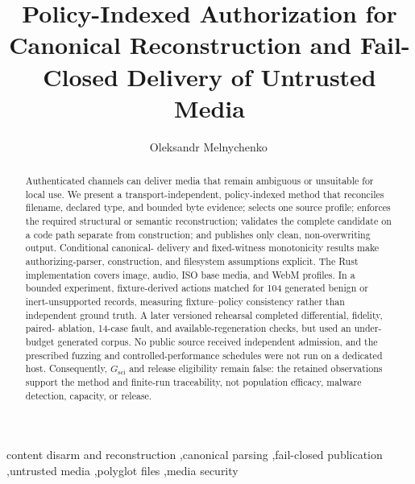 \documentclass[final,5p,times,twocolumn]{elsarticle}
\begin{document}
\begin{frontmatter}

\title{Policy-Indexed Authorization for Canonical Reconstruction and
Fail-Closed Delivery of Untrusted Media}

\author{Oleksandr Melnychenko\texorpdfstring{\,}{}\texorpdfstring{}{}}
\address{Khmelnytskyi National University, Khmelnytskyi, Ukraine}

\begin{abstract}
Authenticated channels can deliver media that remain ambiguous or unsuitable
for local use. We present a transport-independent, policy-indexed method that
reconciles filename, declared type, and bounded byte evidence; selects one
source profile; enforces the required structural or semantic reconstruction;
validates the complete candidate on a code path separate from construction;
and publishes only clean, non-overwriting output. Conditional canonical-
delivery and fixed-witness monotonicity results make authorizing-parser,
construction, and filesystem assumptions explicit. The Rust implementation
covers image, audio, ISO base media, and WebM profiles. In a bounded experiment,
fixture-derived actions matched for 104 generated benign or inert-unsupported
records, measuring fixture--policy consistency rather than independent ground
truth. A later versioned rehearsal completed differential, fidelity, paired-
ablation, 14-case fault, and available-regeneration checks, but used an under-
budget generated corpus. No public source received independent admission, and
the prescribed fuzzing and controlled-performance schedules were not run on a
dedicated host. Consequently, \(G_{\mathrm{sci}}\) and release eligibility
remain false: the retained observations support the method and finite-run
traceability, not population efficacy, malware detection, capacity, or release.
\end{abstract}

\begin{keyword}
content disarm and reconstruction \sep canonical parsing \sep fail-closed
publication \sep untrusted media \sep polyglot files \sep media security
\end{keyword}

\end{frontmatter}
\fontsize{9.5}{10.5}\selectfont















\FloatBarrier

\end{document}
